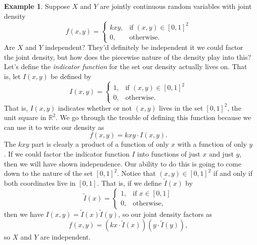 \documentclass[12pt]{article}
\theoremstyle{plain}
\theoremstyle{definition}
\newtheorem{example}[theorem]{Example}
\theoremstyle{remark}
\newcommand{\R}{\mathbb{R}}
\begin{document}
\begin{example}
Suppose $X$ and $Y$ are jointly continuous random variables with joint density
    \[
        f(x,y) = \begin{cases}
            kxy,&\text{if }(x,y)\in [0,1]^2\\
            0,&\text{otherwise.}
        \end{cases}
    \]
Are $X$ and $Y$ independent?
They'd definitely be independent it we could factor the joint density, but how does the piecewise nature of the density play into this?
Let's define the \emph{indicator function} for the set our density actually lives on.
That is, let $I(x,y)$ be defined by
\[
    I(x,y) = \begin{cases}
        1,&\text{if }(x,y)\in [0,1]^2\\
        0,&\text{otherwise.}
    \end{cases}
\]
That is, $I(x,y)$ indicates whether or not $(x,y)$ lives in the set $[0,1]^2$, the unit square in $\R^2$.
We go through the trouble of defining this function because we can use it to write our density as
\[
    f(x,y) = kxy\cdot I(x,y).
\]
The $kxy$ part is clearly a product of a function of only $x$ with a function of only $y$.
If we could factor the indicator function $I$ into functions of just $x$ and just $y$, then we will have shown independence.
Our ability to do this is going to come down to the nature of the set $[0,1]^2$.
Notice that $(x,y)\in [0,1]^2$ if and only if both coordinates live in $[0,1]$.
That is, if we define $\tilde{I}(x)$ by
\[
    \tilde{I}(x) = \begin{cases}
        1,&\text{if }x\in [0,1]\\
        0,&\text{otherwise,}
    \end{cases}
\]
then we have $I(x,y) = \tilde{I}(x)\tilde{I}(y)$, so our joint density factors as
\[
    f(x,y) = (kx\cdot \tilde{I}(x))(y\cdot \tilde{I}(y)),
\]
so $X$ and $Y$ are independent.
\end{example}
\end{document}
